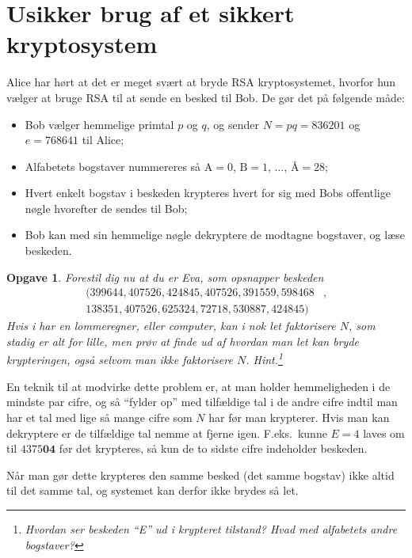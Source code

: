 \documentclass{article}
\theoremstyle{opgavedd}
\newtheorem{opgave}{Opgave}[section]
\begin{document}
\section{Usikker brug af et sikkert kryptosystem}

Alice har hørt at det er meget svært at bryde RSA kryptosystemet, hvorfor hun vælger at
bruge RSA til at sende en besked til Bob. De gør det på følgende måde:

\begin{itemize}
\item Bob vælger hemmelige primtal $p$ og $q$, og sender $N=pq=836201$ og $e=768641$ til
  Alice;
\item Alfabetets bogstaver nummereres så $\text{A}=0$, $\text{B}=1$, $\dots$,
  $\text{Å}=28$;
\item Hvert enkelt bogstav i beskeden krypteres hvert for sig med Bobs offentlige nøgle
  hvorefter de sendes til Bob;
\item Bob kan med sin hemmelige nøgle dekryptere de modtagne bogstaver, og læse beskeden.
\end{itemize}

\begin{opgave}
  Forestil dig nu at du er Eva, som opsnapper beskeden
  \begin{align*}
    (399644, 407526, 424845, 407526, 391559, 598468&,\\
    138351, 407526, 625324, 72718, 530887, 424845)
  \end{align*}
  Hvis i har en lommeregner, eller computer, kan i nok let faktorisere $N$, som stadig er
  alt for lille, men prøv at finde ud af hvordan man let kan bryde krypteringen, også
  selvom man ikke faktorisere $N$. Hint.\footnote{Hvordan ser beskeden ``E'' ud i krypteret
  tilstand? Hvad med alfabetets andre bogstaver?}
\end{opgave}

En teknik til at modvirke dette problem er, at man holder hemmeligheden i de mindste par
cifre, og så ``fylder op'' med tilfældige tal i de andre cifre indtil man har et tal med
lige så mange cifre som $N$ har før man krypterer. Hvis man kan dekryptere er de
tilfældige tal nemme at fjerne igen. F.eks.~kunne $E=4$ laves om til $4375\mathbf{04}$ før
det krypteres, så kun de to sidste cifre indeholder beskeden.

Når man gør dette krypteres den samme besked (det samme bogstav) ikke altid til det samme
tal, og systemet kan derfor ikke brydes så let.
\end{document}
